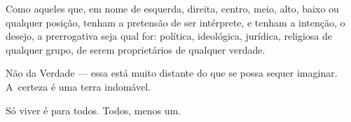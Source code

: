  

Como aqueles que, em nome de esquerda, direita, centro, meio, alto, baixo
ou qualquer posição, tenham a pretensão de ser intérprete, e tenham a
intenção, o desejo, a prerrogativa seja qual for: política, ideológica,
jurídica, religiosa de qualquer grupo, de serem proprietários de
qualquer verdade.

Não da Verdade --- essa está muito distante do que se possa sequer
imaginar. A~certeza é uma terra indomável.

Só viver é para todos. Todos, menos um.%

\fechafala 
